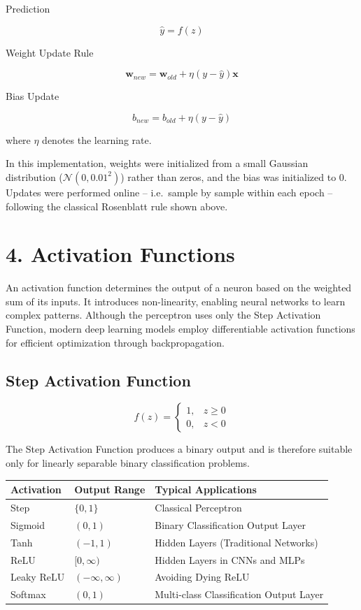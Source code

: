 \documentclass[11pt]{article}
\begin{document}
Prediction

\[
\hat y=f(z)
\]

Weight Update Rule

\[
\mathbf{w}_{new}
=
\mathbf{w}_{old}
+
\eta
(y-\hat y)
\mathbf{x}
\]

Bias Update

\[
b_{new}
=
b_{old}
+
\eta
(y-\hat y)
\]

where $\eta$ denotes the learning rate.

In this implementation, weights were initialized from a small Gaussian distribution ($\mathcal{N}(0, 0.01^2)$) rather than zeros, and the bias was initialized to $0$. Updates were performed online -- i.e.\ sample by sample within each epoch -- following the classical Rosenblatt rule shown above.


\section*{4. Activation Functions}

An activation function determines the output of a neuron based on the weighted sum of its inputs. It introduces non-linearity, enabling neural networks to learn complex patterns. Although the perceptron uses only the Step Activation Function, modern deep learning models employ differentiable activation functions for efficient optimization through backpropagation.

\subsection*{Step Activation Function}

\[
f(z)=
\begin{cases}
1,&z\ge0\\
0,&z<0
\end{cases}
\]

The Step Activation Function produces a binary output and is therefore suitable only for linearly separable binary classification problems.

\begin{center}
\begin{tabular}{|p{2.5cm}|p{3cm}|p{6cm}|}
\hline
\textbf{Activation} & \textbf{Output Range} & \textbf{Typical Applications}\\
\hline
Step & $\{0,1\}$ & Classical Perceptron\\
\hline
Sigmoid & $(0,1)$ & Binary Classification Output Layer\\
\hline
Tanh & $(-1,1)$ & Hidden Layers (Traditional Networks)\\
\hline
ReLU & $[0,\infty)$ & Hidden Layers in CNNs and MLPs\\
\hline
Leaky ReLU & $(-\infty,\infty)$ & Avoiding Dying ReLU\\
\hline
Softmax & $(0,1)$ & Multi-class Classification Output Layer\\
\hline
\end{tabular}
\end{center}
\end{document}
